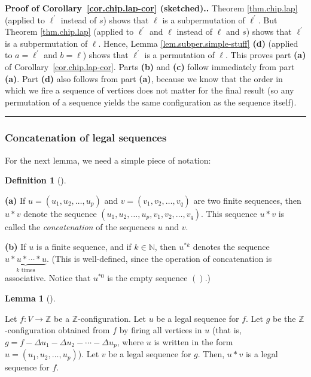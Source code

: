 \documentclass[numbers=enddot,12pt,final,onecolumn,notitlepage]{scrartcl}%
\theoremstyle{definition}
\newtheorem{lem}[theo]{Lemma}
\newenvironment{lemma}[1][]
{\begin{lem}[#1]\begin{leftbar}}
{\end{leftbar}\end{lem}}
\newtheorem{defi}[theo]{Definition}
\newenvironment{definition}[1][]
{\begin{defi}[#1]\begin{leftbar}}
{\end{leftbar}\end{defi}}
\newenvironment{proof}[1][Proof]{\noindent\textbf{#1.} }{\ \rule{0.5em}{0.5em}}
\newcommand{\ZZ}{\mathbb{Z}}
\begin{document}
\begin{proof}[Proof of Corollary~\ref{cor.chip.lap-cor} (sketched).]
Theorem \ref{thm.chip.lap} (applied to $\ell^{\prime}$ instead of $s$) shows
that $\ell$ is a subpermutation of $\ell^{\prime}$. But Theorem
\ref{thm.chip.lap} (applied to $\ell^{\prime}$ and $\ell$ instead of $\ell$
and $s$) shows that $\ell^{\prime}$ is a subpermutation of $\ell$. Hence,
Lemma \ref{lem.subper.simple-stuff} \textbf{(d)} (applied to $a=\ell^{\prime}$
and $b=\ell$) shows that $\ell^{\prime}$ is a permutation of $\ell$. This
proves part \textbf{(a)} of Corollary~\ref{cor.chip.lap-cor}. Parts
\textbf{(b)} and \textbf{(c)} follow immediately from part \textbf{(a)}. Part
\textbf{(d)} also follows from part \textbf{(a)}, because we know that the
order in which we fire a sequence of vertices does not matter for the final
result (so any permutation of a sequence yields the same configuration as the
sequence itself).
\end{proof}

\subsubsection{Concatenation of legal sequences}

For the next lemma, we need a simple piece of notation:

\begin{definition} \label{def.concat}
\textbf{(a)} If $u=\left(  u_{1},u_{2},\ldots,u_{p}\right)  $ and $v=\left(
v_{1},v_{2},\ldots,v_{q}\right)  $ are two finite sequences, then $u\ast v$
denote the sequence $\left(  u_{1},u_{2},\ldots,u_{p},v_{1},v_{2},\ldots
,v_{q}\right)  $. This sequence $u\ast v$ is called the \textit{concatenation}
of the sequences $u$ and $v$.

\textbf{(b)} If $u$ is a finite sequence, and if $k\in\mathbb{N}$, then
$u^{\ast k}$ denotes the sequence $\underbrace{u\ast u\ast\cdots\ast
u}_{k\text{ times}}$. (This is well-defined, since the operation of
concatenation is associative. Notice that $u^{\ast0}$ is the empty sequence
$\left(  {}\right)  $.)
\end{definition}

\begin{lemma}
\label{lem.chip.leg-concat1}
Let $f : V \to \ZZ$ be a $\ZZ$-configuration.
Let $u$ be a legal sequence for $f$.
Let $g$ be the $\ZZ$-configuration obtained from $f$
by firing all vertices in $u$
(that is, $g=f-\Delta u_{1}-\Delta u_{2}-\cdots-\Delta u_{p}$, where $u$ is
written in the form $u=\left(  u_{1},u_{2},\ldots,u_{p}\right)  $).
Let $v$ be a legal sequence for $g$.
Then, $u\ast v$ is a legal sequence for $f$.
\end{lemma}
\end{document}
